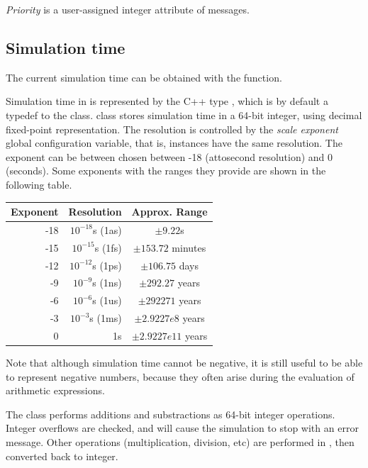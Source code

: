\textit{Priority} is a user-assigned integer
attribute of messages.



\subsection{Simulation time}

The current simulation time can be obtained with the  function.

Simulation time in {\opp} is represented by the C++ type ,
which is by default a typedef to the  class.
 class stores simulation time in a 64-bit integer,
using decimal fixed-point representation. The resolution is controlled
by the \textit{scale exponent} global configuration variable, that is,
 instances have the same resolution. The exponent can be
between chosen between -18 (attosecond resolution) and 0 (seconds).
Some exponents with the ranges they provide are shown in the following table.

\begin{center}
  \begin{tabular}{ | r | r | c | }
    \hline
    Exponent & Resolution & Approx. Range \\ \hline
     -18 & $10^{-18}$s (1as) & $\pm 9.22$s \\
     -15 & $10^{-15}$s (1fs) & $\pm 153.72$ minutes \\
     -12 & $10^{-12}$s (1ps) & $\pm 106.75$ days \\
     -9  & $10^{-9}$s (1ns)  & $\pm 292.27$ years \\
     -6  & $10^{-6}$s (1us)  & $\pm 292271$ years \\
     -3  & $10^{-3}$s (1ms)  & $\pm 2.9227e8$ years \\
     0   & 1s                & $\pm 2.9227e11$ years \\
    \hline
  \end{tabular}
\end{center}

Note that although simulation time cannot be negative, it is still useful to
be able to represent negative numbers, because they often arise
during the evaluation of arithmetic expressions.

The  class performs additions and substractions as 64-bit integer
operations. Integer overflows are checked, and will cause the simulation to
stop with an error message. Other operations (multiplication, division, etc)
are performed in , then converted back to integer.

